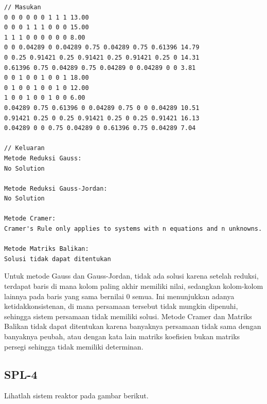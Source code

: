 \begin{enumerate}[label=(\alph*)]
\begin{lstlisting}[caption = spl-3b.txt]
// Masukan
0 0 0 0 0 0 1 1 1 13.00
0 0 0 1 1 1 0 0 0 15.00
1 1 1 0 0 0 0 0 0 8.00
0 0 0.04289 0 0.04289 0.75 0.04289 0.75 0.61396 14.79
0 0.25 0.91421 0.25 0.91421 0.25 0.91421 0.25 0 14.31
0.61396 0.75 0.04289 0.75 0.04289 0 0.04289 0 0 3.81
0 0 1 0 0 1 0 0 1 18.00
0 1 0 0 1 0 0 1 0 12.00
1 0 0 1 0 0 1 0 0 6.00
0.04289 0.75 0.61396 0 0.04289 0.75 0 0 0.04289 10.51
0.91421 0.25 0 0.25 0.91421 0.25 0 0.25 0.91421 16.13
0.04289 0 0 0.75 0.04289 0 0.61396 0.75 0.04289 7.04

// Keluaran
Metode Reduksi Gauss:
No Solution

Metode Reduksi Gauss-Jordan:
No Solution

Metode Cramer:
Cramer's Rule only applies to systems with n equations and n unknowns.

Metode Matriks Balikan:
Solusi tidak dapat ditentukan\end{lstlisting}

Untuk metode Gauss dan Gauss-Jordan, tidak ada solusi karena setelah reduksi, terdapat baris di mana kolom paling akhir memiliki nilai, sedangkan kolom-kolom lainnya pada baris yang sama bernilai 0 semua. Ini menunjukkan adanya ketidakkonsistenan, di mana persamaan tersebut tidak mungkin dipenuhi, sehingga sistem persamaan tidak memiliki solusi. Metode Cramer dan Matriks Balikan tidak dapat ditentukan karena banyaknya persamaan tidak sama dengan banyaknya peubah, atau dengan kata lain matriks koefisien bukan matriks persegi sehingga tidak memiliki determinan.

\end{enumerate}
\pagebreak
\subsection{SPL-4}
Lihatlah sistem reaktor pada gambar berikut.


